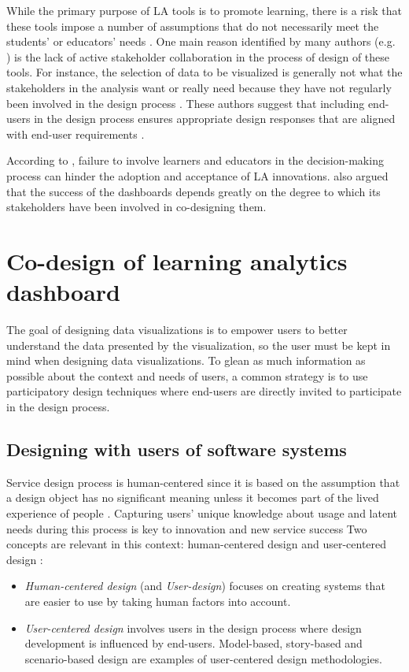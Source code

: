\documentclass[manuscript,screen,nonacm,12pt]{acmart}
\begin{document}
While the primary purpose of LA tools is to promote learning, there is a risk that these tools impose a number of assumptions that do not necessarily meet the students' or educators' needs \cite{dawson2015challenging}. One main reason identified by many authors (e.g. \cite{buckingham2019human}) is the lack of active stakeholder collaboration in the process of design of these tools. 
For instance, the selection of data to be visualized is generally not what the stakeholders in the analysis want or really need because they have not regularly been involved in the design process \citep{Holstein2017}.
These authors suggest that including end-users in the design process ensures appropriate design responses that are aligned with end-user requirements \cite{taffe2015hybrid}. 

According to \citet{beattie2014creepy}, failure to involve learners and educators in the decision-making process can hinder the adoption and acceptance of LA innovations. \citet{Holstein2017} also argued that the success of the dashboards depends greatly on the degree to which its stakeholders have been involved in co-designing them. 

\section{Co-design of learning analytics dashboard}
The goal of designing data visualizations is to empower users to better understand the data presented by the visualization, so the user must be kept in mind when designing data visualizations. 
To glean as much information as possible about the context and needs of users, 
a common strategy is to use participatory design techniques where end-users are directly invited to participate in the design process. 

\subsection{Designing with users of software systems}
Service design process is human-centered since it is based on the assumption that a design object has no significant meaning unless it becomes part of the lived experience of people \cite{krippendorff2005semantic}.
Capturing users' unique knowledge about usage and latent needs during this process  is key to innovation and new service success \cite{mahr2014value}
Two concepts are relevant in this context: human-centered design and user-centered design :
\begin{itemize}
    \item \textit{Human-centered design} (and \textit{User-design}) focuses on creating systems that are easier to use by taking human factors into account.
    \item \textit{User-centered design} involves users in the design process where design development is influenced by end-users. Model-based, story-based and scenario-based design are examples of user-centered design methodologies. 
\end{itemize}
\end{document}
